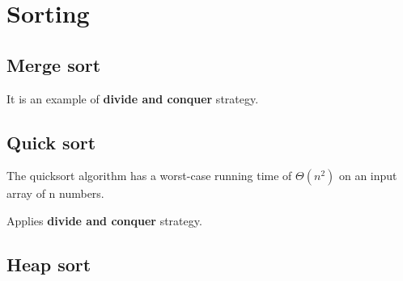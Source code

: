 \chapter{Sorting}
\section{Merge sort}

It is an example of \textbf{divide and conquer} strategy.

\section{Quick sort}
The quicksort algorithm has a worst-case running time of $\Theta(n^{2})$ on an input array of n numbers.

Applies \textbf{divide and conquer} strategy.

\section{Heap sort}